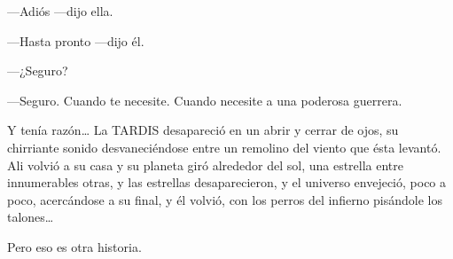 ---Adiós ---dijo ella.

---Hasta pronto ---dijo él.

---¿Seguro?

---Seguro. Cuando te necesite. Cuando necesite a una poderosa guerrera.

Y tenía razón\ldots{} La TARDIS desapareció en un abrir y cerrar de
ojos, su chirriante sonido desvaneciéndose entre un remolino del viento
que ésta levantó. Ali volvió a su casa y su planeta giró alrededor del
sol, una estrella entre innumerables otras, y las estrellas
desaparecieron, y el universo envejeció, poco a poco, acercándose a su
final, y él volvió, con los perros del infierno pisándole los
talones\ldots{}

Pero eso es otra historia.